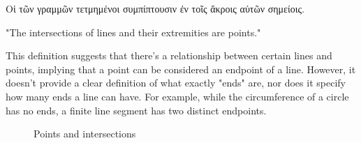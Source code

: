 
\begin{defin}
\textgreek{Οἱ τῶν γραμμῶν τετμημένοι συμπίπτουσιν ἐν τοῖς ἄκροις αὐτῶν σημείοις.}

"The intersections of lines and their extremities are points."
\end{defin}

This definition suggests that there's a relationship between certain lines and points, implying that a point can be considered an endpoint of a line. However, it doesn't provide a clear definition of what exactly "ends" are, nor does it specify how many ends a line can have. For example, while the circumference of a circle has no ends, a finite line segment has two distinct endpoints.

\fs

\begin{figure}[H]
    \centering
    \begin{subfigure}{0.4\textwidth}
    \end{subfigure}
    \begin{subfigure}{0.4\textwidth}
    \end{subfigure}
    \caption{Points and intersections}
\end{figure}

\clearpage